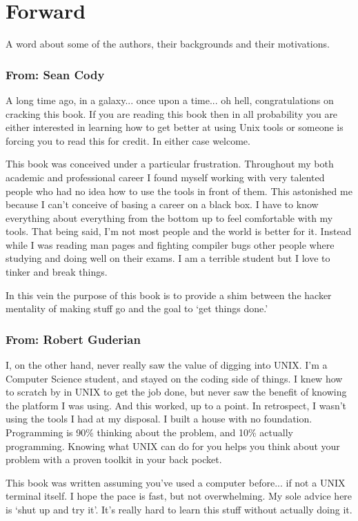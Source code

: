 \chapter{Forward}

A word about some of the authors, their backgrounds and their motivations.

\subsection{From: Sean Cody}
A long time ago, in a galaxy... once upon a time... oh hell, congratulations on cracking this book. 
 If you are reading this book then in all probability you
are either interested in learning how to get better at using Unix tools or 
someone is forcing you to read this for credit.  In either case welcome.

This book was conceived under a particular frustration.  Throughout my
both academic and professional career I found myself working with very talented
people who had no idea how to use the tools in front of them.  This astonished
me because I can't conceive of basing a career on a black box.  I have to know
everything about everything from the bottom up to feel comfortable with my 
tools.  That being said, I'm not most people and the world is better for it.  
Instead while I was reading man pages and fighting compiler bugs other people 
where studying and doing well on their exams.  I am a terrible student but 
I love to tinker and break things.

In this vein the purpose of this book is to provide a shim between the hacker
mentality of making stuff go and the goal to `get things done.'

\subsection{From: Robert Guderian}

I, on the other hand, never really saw the value of digging into UNIX. I'm
a Computer Science student, and stayed on the coding side of things. 
I knew how to scratch by in UNIX to get the job done, but never saw
the benefit of knowing the platform I was using. And this worked, up to a point.
In retrospect, I wasn't using the tools I had at my disposal. I built a 
house with no foundation. Programming is 90\% thinking about the problem, and 10\%  actually
programming. Knowing what UNIX can do for you helps you think about your problem with a
proven toolkit in your back pocket.

This book was written assuming you've used a computer before... if not a UNIX terminal itself. 
I hope the pace is fast, but not overwhelming. My sole advice here is `shut up and try it'. 
It's really hard to learn this stuff without actually doing it.
